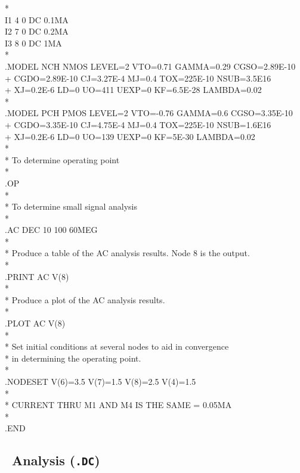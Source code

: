 {*\\
I1 4 0 DC 0.1MA\\
I2 7 0 DC 0.2MA\\
I3 8 0 DC 1MA\\
*\\
.MODEL NCH NMOS LEVEL=2 VTO=0.71 GAMMA=0.29 CGSO=2.89E-10\\
+ CGDO=2.89E-10 CJ=3.27E-4 MJ=0.4 TOX=225E-10 NSUB=3.5E16\\
+ XJ=0.2E-6 LD=0 UO=411 UEXP=0 KF=6.5E-28 LAMBDA=0.02 \\
*\\
.MODEL PCH PMOS LEVEL=2 VTO=-0.76 GAMMA=0.6 CGSO=3.35E-10\\
+ CGDO=3.35E-10 CJ=4.75E-4 MJ=0.4 TOX=225E-10 NSUB=1.6E16\\
+ XJ=0.2E-6 LD=0 UO=139 UEXP=0 KF=5E-30 LAMBDA=0.02\\
*\\
* To determine operating point\\
*\\
.OP\\
*\\
* To determine small signal analysis\\
*\\
.AC DEC 10 100 60MEG \\
*\\
* Produce a table of the AC analysis results.  Node 8 is the output.\\
*\\
.PRINT AC V(8)\\
*\\
* Produce a plot of the AC analysis results.\\
*\\
.PLOT AC V(8)\\
*\\
* Set initial conditions at several nodes to aid in convergence\\
* in determining the operating point.\\
*\\
.NODESET V(6)=3.5 V(7)=1.5 V(8)=2.5 V(4)=1.5\\
*\\
* CURRENT THRU M1 AND M4 IS THE SAME = 0.05MA\\
*\\
.END\\
}

\subsection{\dc\ Analysis ({\tt .DC})\label{ex:opamp:DC}}

